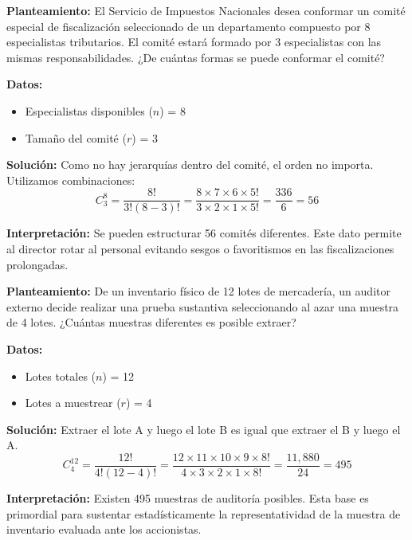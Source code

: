 \documentclass[12pt,letterpaper]{book}
\newcounter{ejemplo}[chapter]
\begin{document}
\begin{ejemplo}
    \textbf{Planteamiento:} El Servicio de Impuestos Nacionales desea conformar un comité especial de fiscalización seleccionado de un departamento compuesto por 8 especialistas tributarios. El comité estará formado por 3 especialistas con las mismas responsabilidades. ¿De cuántas formas se puede conformar el comité?
    
    \textbf{Datos:}
    \begin{itemize}
        \item Especialistas disponibles ($n$) = 8
        \item Tamaño del comité ($r$) = 3
    \end{itemize}
    
    \textbf{Solución:}
    Como no hay jerarquías dentro del comité, el orden no importa. Utilizamos combinaciones:
    \[ C_{3}^{8} = \frac{8!}{3!(8-3)!} = \frac{8 \times 7 \times 6 \times 5!}{3 \times 2 \times 1 \times 5!} = \frac{336}{6} = 56 \]
    
    \textbf{Interpretación:} Se pueden estructurar 56 comités diferentes. Este dato permite al director rotar al personal evitando sesgos o favoritismos en las fiscalizaciones prolongadas.
\end{ejemplo}

\begin{ejemplo}
    \textbf{Planteamiento:} De un inventario físico de 12 lotes de mercadería, un auditor externo decide realizar una prueba sustantiva seleccionando al azar una muestra de 4 lotes. ¿Cuántas muestras diferentes es posible extraer?
    
    \textbf{Datos:}
    \begin{itemize}
        \item Lotes totales ($n$) = 12
        \item Lotes a muestrear ($r$) = 4
    \end{itemize}
    
    \textbf{Solución:}
    Extraer el lote A y luego el lote B es igual que extraer el B y luego el A.
    \[ C_{4}^{12} = \frac{12!}{4!(12-4)!} = \frac{12 \times 11 \times 10 \times 9 \times 8!}{4 \times 3 \times 2 \times 1 \times 8!} = \frac{11,880}{24} = 495 \]
    
    \textbf{Interpretación:} Existen 495 muestras de auditoría posibles. Esta base es primordial para sustentar estadísticamente la representatividad de la muestra de inventario evaluada ante los accionistas.
\end{ejemplo}
\end{document}
